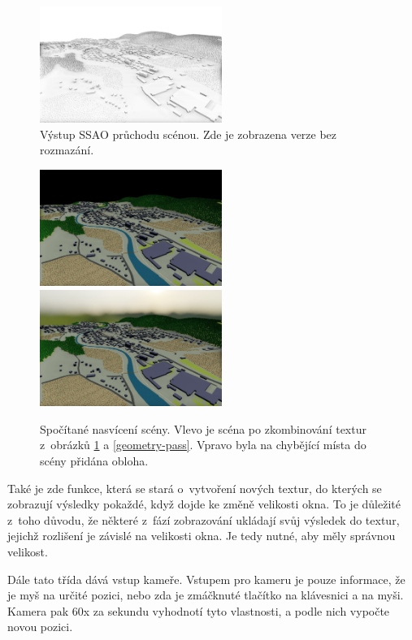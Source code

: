 \begin{figure}[H]
	\centering
	\includegraphics[width=16em]{images/impl/gbuffer/ssao.png}
	\caption[caption]{Výstup SSAO průchodu scénou. Zde je zobrazena verze bez rozmazání.} 
	\label{ssao-pass}
\end{figure}


\begin{figure}[H]
	\centering
	\includegraphics[width=16em]{images/impl/gbuffer/lightning.jpg}
		\includegraphics[width=16em]{images/impl/gbuffer/sky.jpg}
	\caption[caption]{Spočítané nasvícení scény. Vlevo je scéna po zkombinování textur z~obrázků \ref{ssao-pass} a \ref{geometry-pass}. Vpravo byla na chybějící místa do scény přidána obloha.} 
	\label{lightning-pass}
\end{figure}

Také je zde funkce, která se stará o~vytvoření nových textur, do kterých se zobrazují výsledky pokaždé, když dojde ke změně velikosti okna. To je důležité z~toho důvodu, že některé z~fází zobrazování ukládají svůj výsledek do textur, jejichž rozlišení je závislé na velikosti okna. Je tedy nutné, aby měly správnou velikost.

Dále tato třída dává vstup kameře. Vstupem pro kameru je pouze informace, že je myš na určité pozici, nebo zda je zmáčknuté tlačítko na klávesnici a na myši. Kamera pak 60x za sekundu vyhodnotí tyto vlastnosti, a podle nich vypočte novou pozici.


